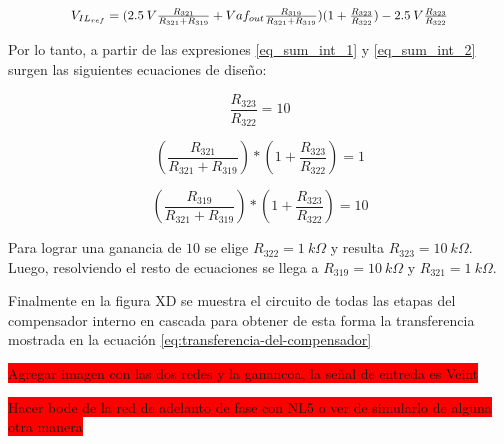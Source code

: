 \begin{equation}\label{eq_sum_int_2}
	\resizebox{.8\hsize}{!}
	{
		$
		V_{IL_{ref}}=(2.5\:V\frac{R_{321}}{R_{321}+R_{319}}+Vaf_{out}\frac{R_{319}}{R_{321}+R_{319}})(1+\frac{R_{323}}{R_{322}})-2.5\:V\frac{R_{323}}{R_{322}}
		$
	}
\end{equation}

Por lo tanto, a partir de las expresiones \ref{eq_sum_int_1} y \ref{eq_sum_int_2} surgen las siguientes ecuaciones de diseño:

\begin{equation}
	\frac{R_{323}}{R_{322}}=10
\end{equation}

\begin{equation} 
	(\frac{R_{321}}{R_{321}+R_{319}})*(1+\frac{R_{323}}{R_{322}}) = 1
\end{equation}

\begin{equation} 
(\frac{R_{319}}{R_{321}+R_{319}})*(1+\frac{R_{323}}{R_{322}}) = 10
\end{equation}

Para lograr una ganancia de $10$ se elige $R_{322} = 1\:k\Omega$ y resulta $R_{323} = 10\:k\Omega$. Luego, resolviendo el resto de ecuaciones se llega a $R_{319}=10\:k\Omega$ y $R_{321}=1\:k\Omega$.

Finalmente en la figura XD se muestra el circuito de todas las etapas del compensador interno en cascada para obtener de esta forma la transferencia mostrada en la ecuación \ref{eq:transferencia-del-compensador}

\colorbox{red}{Agregar imagen con las dos redes y la ganancoa, la señal de entreda es Veint}

\colorbox{red}{Hacer bode de la red de adelanto de fase con NL5 o ver de simularlo de alguna otra manera}